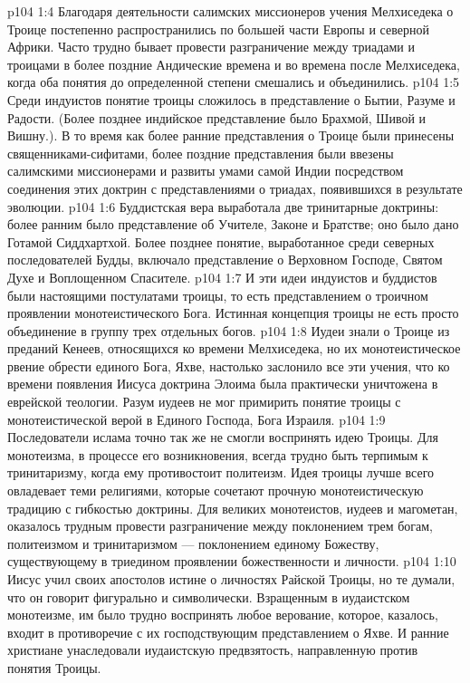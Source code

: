 \vs p104 1:4 Благодаря деятельности салимских миссионеров учения Мелхиседека о Троице постепенно распространились по большей части Европы и северной Африки. Часто трудно бывает провести разграничение между триадами и троицами в более поздние Андические времена и во времена после Мелхиседека, когда оба понятия до определенной степени смешались и объединились.
\vs p104 1:5 \pc Среди индуистов понятие троицы сложилось в представление о Бытии, Разуме и Радости. (Более позднее индийское представление было Брахмой, Шивой и Вишну.). В то время как более ранние представления о Троице были принесены священниками\hyp{}сифитами, более поздние представления были ввезены салимскими миссионерами и развиты умами самой Индии посредством соединения этих доктрин с представлениями о триадах, появившихся в результате эволюции.
\vs p104 1:6 Буддистская вера выработала две тринитарные доктрины: более ранним было представление об Учителе, Законе и Братстве; оно было дано Готамой Сиддхартхой. Более позднее понятие, выработанное среди северных последователей Будды, включало представление о Верховном Господе, Святом Духе и Воплощенном Спасителе.
\vs p104 1:7 И эти идеи индуистов и буддистов были настоящими постулатами троицы, то есть представлением о троичном проявлении монотеистического Бога. Истинная концепция троицы не есть просто объединение в группу трех отдельных богов.
\vs p104 1:8 \pc Иудеи знали о Троице из преданий Кенеев, относящихся ко времени Мелхиседека, но их монотеистическое рвение обрести единого Бога, Яхве, настолько заслонило все эти учения, что ко времени появления Иисуса доктрина Элоима была практически уничтожена в еврейской теологии. Разум иудеев не мог примирить понятие троицы с монотеистической верой в Единого Господа, Бога Израиля.
\vs p104 1:9 Последователи ислама точно так же не смогли воспринять идею Троицы. Для монотеизма, в процессе его возникновения, всегда трудно быть терпимым к тринитаризму, когда ему противостоит политеизм. Идея троицы лучше всего овладевает теми религиями, которые сочетают прочную монотеистическую традицию с гибкостью доктрины. Для великих монотеистов, иудеев и магометан, оказалось трудным провести разграничение между поклонением трем богам, политеизмом и тринитаризмом --- поклонением единому Божеству, существующему в триедином проявлении божественности и личности.
\vs p104 1:10 \pc Иисус учил своих апостолов истине о личностях Райской Троицы, но те думали, что он говорит фигурально и символически. Взращенным в иудаистском монотеизме, им было трудно воспринять любое верование, которое, казалось, входит в противоречие с их господствующим представлением о Яхве. И ранние христиане унаследовали иудаистскую предвзятость, направленную против понятия Троицы.
